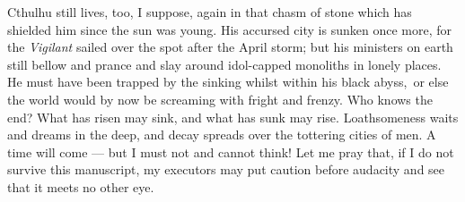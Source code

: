 Cthulhu still lives, too, I suppose, again in that chasm of stone which
has shielded him since the sun was young. His accursed city is sunken
once more, for the \emph{Vigilant} sailed over the spot after the April storm;
but his ministers on earth still bellow and prance and slay around
idol-capped monoliths in lonely places. He must have been trapped by the
sinking whilst within his black abyss,\est\ or else the world would by now be
screaming with fright and frenzy. Who knows the end? What has risen may
sink, and what has sunk may rise. Loathsomeness waits and dreams in the
deep, and decay spreads over the tottering cities of men. A time will
come --- but I must not and cannot think! Let me pray that, if I do not
survive this manuscript, my executors may put caution before audacity
and see that it meets no other eye.